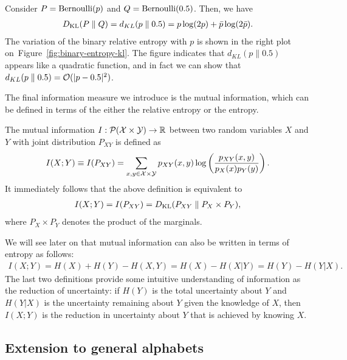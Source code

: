 \documentclass[12pt]{article}
\begin{document}
\begin{example}
\label{example:binary-kl} Consider $P=\mathrm{Bernoulli}(p)$ and $Q = \mathrm{Bernoulli}(0.5)$. Then, we have 
\begin{align}
	D_{\text{KL}}(P \parallel Q) = d_{KL}(p \parallel 0.5) = p \log (2 p) + \bar{p}\log(2 \bar{p}). 
\end{align}
The variation of the binary relative entropy with $p$ is shown in the right plot on~Figure~\ref{fig:binary-entropy-kl}. The figure indicates that $d_{KL}(p\parallel 0.5)$ appears like a quadratic function, and in fact we can show that $d_{KL}(p\parallel 0.5) = {\cal O}(|p-0.5|^2)$.
\end{example}

The final information measure we introduce is the mutual information, which can be defined in terms of the either the relative entropy or the entropy. 
\begin{definition}
\label{def:mutual-information-discrete} The mutual information $I:{\cal P}({\cal X} \times {\cal Y}) \to \mathbb{R}$ between two random variables $X$ and $Y$ with joint distribution $P_{XY}$ is defined as 
\begin{align}
I(X; Y) \equiv I(P_{XY}) = \sum_{x, y \in {\cal X} \times {\cal Y}} p_{XY}(x, y) \log \left( \frac{p_{XY}(x,y)}{p_X(x) p_Y(y)} \right). 
\end{align}
It immediately follows that the above definition is equivalent to 
\begin{align}
I(X; Y) = I(P_{XY}) = D_{\text{KL}}( P_{XY} \parallel P_X \times P_Y), 
\end{align}
where $P_X \times P_Y$ denotes the product of the marginals. 
\end{definition}
We will see later on that mutual information can also be written in terms of entropy as follows: 
\begin{align}
I(X;Y) = H(X) + H(Y) - H(X, Y) = H(X) - H(X|Y) = H(Y) - H(Y|X). 
\end{align}
The last two definitions provide some intuitive understanding of information as the reduction of uncertainty: if $H(Y)$ is the total uncertainty about $Y$ and $H(Y|X)$ is the uncertainty remaining about $Y$ given the knowledge of $X$, then $I(X;Y)$ is the reduction in uncertainty about $Y$ that is achieved by knowing $X$. 


\subsection{Extension to general alphabets}
\label{subsec:extention-to-general-alphabet}
\end{document}
